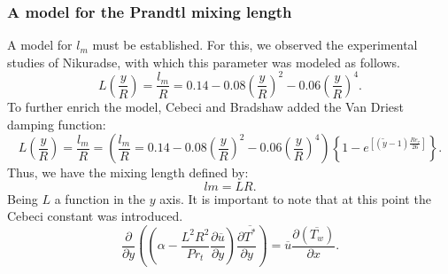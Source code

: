 \documentclass[xcolor=dvipsnames,8pt,aspectratio=34]{beamer}
\begin{document}
	
		\begin{frame}
			\frametitle{A model for the Prandtl mixing length}
			A model for $ l_m $ must be established. For this, we observed the experimental studies of Nikuradse, with which this parameter was modeled as follows.
			\begin{equation}
			L\left(\frac{y}{R}\right) = \frac{l_m}{R} = 0.14 - 0.08 \left(\frac{y}{R}\right)^2 - 0.06\left(\frac{y}{R}\right)^4.
			\end{equation}
			To further enrich the model, Cebeci and Bradshaw added the Van Driest damping function:
			\begin{equation}
			L\left(\frac{y}{R}\right)  = \frac{l_m}{R} = \left(\frac{l_m}{R} = 0.14 - 0.08 \left(\frac{y}{R}\right)^2 - 0.06\left(\frac{y}{R}\right)^4\right)\left\{  1 - e^{[(\tilde{y} - 1) \frac{Re_\tau}{26}]}\right\}.
			\end{equation}
			Thus, we have the mixing length defined by:
			\begin{equation}
			lm = L R.
			\end{equation}
			Being $ L $ a function in the $ y $ axis. It is important to note that at this  point the Cebeci constant was introduced.
			\begin{equation}
			{\frac{\partial{}}{\partial{y}}} \left( \left( \alpha   
			- \frac{{L}^2 R ^2}{Pr_t}\frac{\partial \overline{u}}{\partial y} \right) \frac{\partial \overline{T^\ast}}{\partial y} \right)
			= 
			\overline{u}\frac{\partial{}\left(\overline{T_w}\right)  }{\partial{x}}.
			\end{equation}
		\end{frame}
		
		
		
		
		
\end{document}
